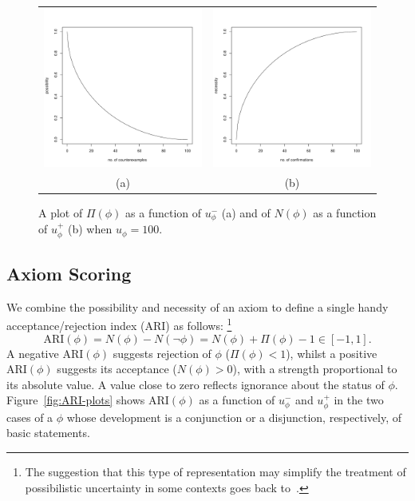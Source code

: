 \documentclass[review]{elsarticle}
\theoremstyle{definition}
\begin{document}
\begin{figure}[t]
  \begin{center}
    \begin{tabular}{cc}
      \includegraphics[width=2.25in]{../possibility} &
      \includegraphics[width=2.25in]{../necessity} \\
      (a) & (b)
    \end{tabular}
  \end{center}
  \caption{A plot of $\Pi(\phi)$  as a function of
    $u_\phi^-$ (a) and of $N(\phi)$ as a function of
    $u_\phi^+$ (b) when $u_\phi = 100$.\label{fig:poss-nec-plots}}
\end{figure}

\subsection{Axiom Scoring}

We combine the possibility and necessity of an axiom to define
a single handy acceptance/rejection index (ARI) as follows:%
\footnote{The suggestion that this type of representation
may simplify the treatment of possibilistic uncertainty in some contexts
goes back to~\cite{GarciaMolinaRiosCardenosa1991}.}
\begin{equation}\label{eq:ARI}
  \mathrm{ARI}(\phi) = N(\phi) - N(\neg\phi) = N(\phi) + \Pi(\phi) - 1 \in [-1, 1].
\end{equation}
A negative $\mathrm{ARI}(\phi)$ suggests rejection of $\phi$ ($\Pi(\phi)<1$),
whilst a positive $\mathrm{ARI}(\phi)$ suggests its acceptance ($N(\phi)>0$),
with a strength proportional to its absolute value. A value close to zero
reflects ignorance about the status of $\phi$.
Figure~\ref{fig:ARI-plots} shows $\mathrm{ARI}(\phi)$  as a function of
$u_\phi^-$ and $u_\phi^+$ in the two cases of a $\phi$ whose development
is a conjunction or a disjunction, respectively, of basic statements.
\end{document}
